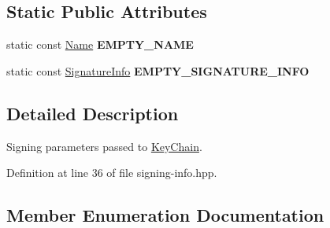 \subsection*{Static Public Attributes}
\begin{DoxyCompactItemize}
\item 
static const \hyperlink{classndn_1_1Name}{Name} {\bfseries E\+M\+P\+T\+Y\+\_\+\+N\+A\+ME}\hypertarget{classndn_1_1security_1_1SigningInfo_a4a9fa27cbe43cc055d6af2fe4696fd96}{}\label{classndn_1_1security_1_1SigningInfo_a4a9fa27cbe43cc055d6af2fe4696fd96}

\item 
static const \hyperlink{classndn_1_1SignatureInfo}{Signature\+Info} {\bfseries E\+M\+P\+T\+Y\+\_\+\+S\+I\+G\+N\+A\+T\+U\+R\+E\+\_\+\+I\+N\+FO}\hypertarget{classndn_1_1security_1_1SigningInfo_af51c0428d47fda5b72f3ce7810a225b2}{}\label{classndn_1_1security_1_1SigningInfo_af51c0428d47fda5b72f3ce7810a225b2}

\end{DoxyCompactItemize}


\subsection{Detailed Description}
Signing parameters passed to \hyperlink{classndn_1_1security_1_1KeyChain}{Key\+Chain}. 

Definition at line 36 of file signing-\/info.\+hpp.



\subsection{Member Enumeration Documentation}
